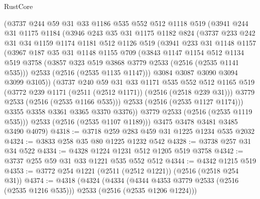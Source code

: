 \begin{lexlean}{RustCore}
\begin{coremodule}
        (@3737
          @244
          @59
          @31
          @33
          @1186
          @535
          @552
          @512
          @1118
          @519
          (@3941
            @244
            @31
            @1175
            @1184
            (@3946
              @243
              @35
              @31
              @1175
              @1182
              @824
              (@3737
                @233
                @242
                @31
                @34
                @1159
                @1174
                @1181
                @512
                @1126
                @519
                (@3941
                  @233
                  @31
                  @1148
                  @1157
                  (@3967
                    @187
                    @35
                    @31
                    @1148
                    @1155
                    @709
                    (@3843
                      @1147
                      @1154
                      @512
                      @1134
                      @519
                      @3758
                      (@3857 @323 @519 @3868 @3779 @2533 (@2516 (@2535 @1141 @535)))
                      @2533
                      (@2516 (@2535 @1135 @1147)))
                    @3084
                    @3087
                    @3090
                    @3094
                    @3099
                    @3105))
                (@3737
                  @240
                  @59
                  @31
                  @33
                  @1171
                  @535
                  @552
                  @512
                  @1165
                  @519
                  (@3772 @239 @1171 (@2511 (@2512 @1171)) (@2516 (@2518 @239 @31)))
                  @3779
                  @2533
                  (@2516 (@2535 @1166 @535)))
                @2533
                (@2516 (@2535 @1127 @1174)))
              @3355
              @3358
              @3361
              @3365
              @3370
              @3376))
          @3779
          @2533
          (@2516 (@2535 @1119 @535)))
        @2533
        (@2516 (@2535 @1107 @1189)))
      @3475
      @3478
      @3481
      @3485
      @3490
      @4079)
@4318 := @3718 @259 @283 @459 @31 @1225 @1234 @535 @2032
@4324 := @3833 @258 @35 @80 @1225 @1232 @542
@4328 := @3738 @257 @31 @34 @522
@4334 := @4328 @1224 @1231 @512 @1205 @519 @3758
@4342 := @3737 @255 @59 @31 @33 @1221 @535 @552 @512
@4344 := @4342 @1215 @519
@4353 := @3772 @254 @1221 (@2511 (@2512 @1221)) (@2516 (@2518 @254 @31))
@4374 := @4318
    (@4324
      (@4334 (@4344 @4353 @3779 @2533 (@2516 (@2535 @1216 @535))) @2533 (@2516 (@2535 @1206 @1224)))

\end{coremodule}
\end{lexlean}
